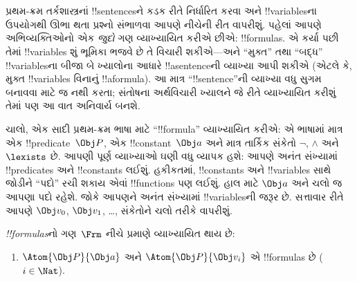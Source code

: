 \documentclass[../../../include/open-logic-section]{subfiles}
\begin{document}

\section{}

પ્રથમ-ક્રમ તર્કશાસ્ત્રનાં !!{sentence}sને કડક રીતે નિર્ધારિત કરવા અને
!!{variable}sના ઉપયોગથી ઊભા થતા પ્રશ્નો સંભાળવા આપણે નીચેની રીત
વાપરીશું. પહેલાં આપણે અભિવ્યક્તિઓનો એક \emph{જુદો} ગણ વ્યાખ્યાયિત કરીએ છીએ:
!!{formula}s. એ કર્યા પછી તેમાં !!{variable}s શું ભૂમિકા ભજવે છે તે
વિચારી શકીએ---અને ``મુક્ત'' તથા ``બદ્ધ'' !!{variable}sના બીજા બે
ખ્યાલોના આધારે !!a{sentence}ની વ્યાખ્યા આપી શકીએ (એટલે કે, મુક્ત
!!{variable}s વિનાનું !!a{formula}). આ માત્ર ``!!{sentence}''ની
વ્યાખ્યા વધુ સુગમ બનાવવા માટે જ નથી કરતા; સંતોષના અર્થવિચારી ખ્યાલને
જે રીતે વ્યાખ્યાયિત કરીશું તેમાં પણ આ વાત અનિવાર્ય બનશે.

ચાલો, એક સાદી પ્રથમ-ક્રમ ભાષા માટે ``!!{formula}'' વ્યાખ્યાયિત કરીએ:
એ ભાષામાં માત્ર એક !!{predicate}~$\Obj P$, એક !!{constant}~$\Obj a$
અને માત્ર તાર્કિક સંકેતો $\lnot$, $\land$ અને~$\lexists$ છે. આપણી
પૂર્ણ વ્યાખ્યાઓ ઘણી વધુ વ્યાપક હશે: આપણે અનંત સંખ્યામાં !!{predicate}s
અને !!{constant}s લઈશું. હકીકતમાં, !!{constant}s અને !!{variable}s
સાથે જોડીને ``પદો'' રચી શકાય એવાં !!{function}s પણ લઈશું. હાલ માટે
$\Obj a$ અને ચલો જ આપણા પદો રહેશે. જોકે આપણને અનંત સંખ્યામાં
!!{variable}sની જરૂર છે. સત્તાવાર રીતે આપણે $\Obj v_0$, $\Obj v_1$,
\dots, સંકેતોને ચલો તરીકે વાપરીશું.

\begin{defn}
\emph{!!{formula}s}નો ગણ~$\Frm$ નીચે પ્રમાણે વ્યાખ્યાયિત થાય છે:
\begin{enumerate}
\item{} $\Atom{\Obj P}{\Obj a}$ અને $\Atom{\Obj
  P}{\Obj v_i}$ એ !!{formula}s છે ($i \in \Nat$).




\end{enumerate}
\end{defn}
\end{document}

